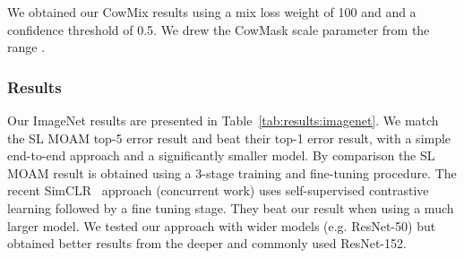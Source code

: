 \documentclass{article}
\begin{document}
We obtained our CowMix results using a mix loss weight of 100 and and a confidence threshold of 0.5.
We drew the CowMask  scale parameter from the range .



\subsubsection{Results}

Our ImageNet results are presented in Table~\ref{tab:results:imagenet}.
We match the SL MOAM \cite{Zhai:S4L} top-5 error result and beat their top-1 error result, with a
simple end-to-end approach and a significantly smaller model.
By comparison the SL MOAM result is obtained using a 3-stage training and fine-tuning procedure.
The recent SimCLR~\cite{Chen:SimCLR} approach (concurrent work) uses self-supervised contrastive learning followed
by a fine tuning stage.
They beat our result when using a much larger model.
We tested our approach with wider models (e.g. ResNet-50) but obtained better results from the deeper
and commonly used ResNet-152.
\end{document}
